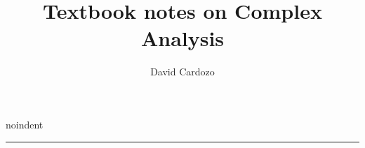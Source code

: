 \documentclass[notitlepage]{article}
\author{David Cardozo}
\title{Textbook notes on Complex Analysis}
\begin{document}





noindent\rule{\textwidth}{1pt}\\[-0.1cm]


\end{document}
